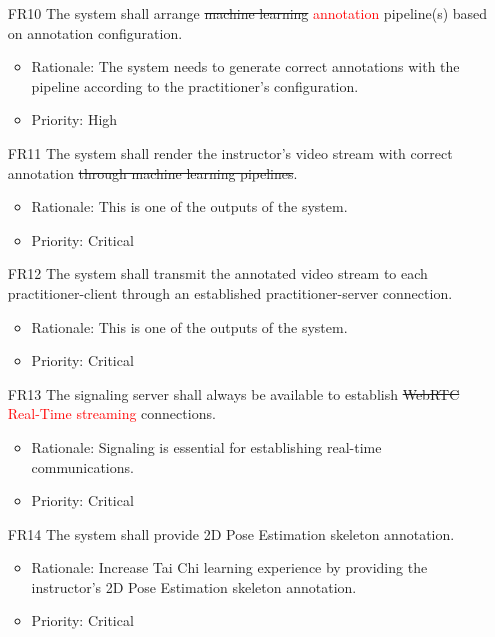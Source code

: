 \documentclass[12pt]{article}
\begin{document}
\begin{itemize}
    \item[FR10] The system shall arrange \sout{machine learning} \textcolor{red}{annotation} pipeline(s) based on annotation configuration. \label{FR10}
    \begin{itemize}
        \item Rationale: The system needs to generate correct annotations with the pipeline according to the practitioner’s configuration.
        \item Priority: High
    \end{itemize}
\end{itemize}
\begin{itemize}
    \item[FR11] The system shall render the instructor’s video stream with correct annotation \sout{through machine learning pipelines}. \label{FR11}
    \begin{itemize}
        \item Rationale: This is one of the outputs of the system.
        \item Priority: Critical
    \end{itemize}
\end{itemize}
\begin{itemize}
    \item[FR12] The system shall transmit the annotated video stream to each practitioner-client through an established practitioner-server connection. \label{FR12}
    \begin{itemize}
        \item Rationale: This is one of the outputs of the system.
        \item Priority: Critical
    \end{itemize}
\end{itemize}
\begin{itemize}
    \item[FR13] The signaling server shall always be available to establish \sout{WebRTC} \textcolor{red}{Real-Time streaming} connections. \label{FR13}
    \begin{itemize}
        \item Rationale: Signaling is essential for establishing real-time communications.
        \item Priority: Critical
    \end{itemize}
\end{itemize}
\begin{itemize}
\color{red}
    \item[FR14] The system shall provide 2D Pose Estimation skeleton annotation.\label{FR14}
    \begin{itemize}
        \item Rationale: Increase Tai Chi learning experience by providing the instructor's 2D Pose Estimation skeleton annotation.
        \item Priority: Critical
    \end{itemize}
\end{itemize}
\end{document}
